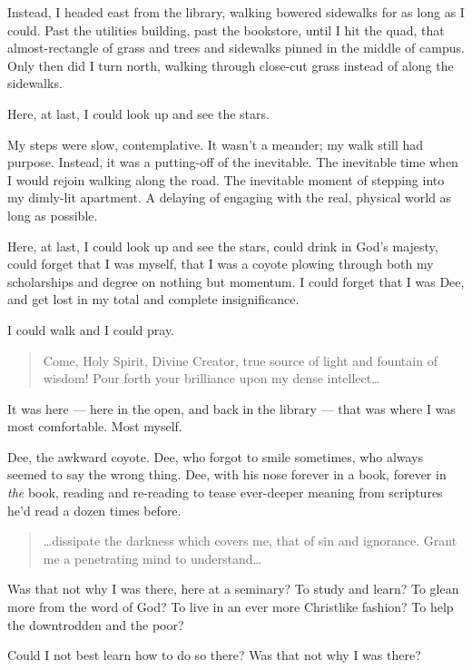 Instead, I headed east from the library, walking bowered sidewalks for as long as I could. Past the utilities building, past the bookstore, until I hit the quad, that almost-rectangle of grass and trees and sidewalks pinned in the middle of campus. Only then did I turn north, walking through close-cut grass instead of along the sidewalks.

Here, at last, I could look up and see the stars.

My steps were slow, contemplative. It wasn't a meander; my walk still had purpose. Instead, it was a putting-off of the inevitable. The inevitable time when I would rejoin walking along the road. The inevitable moment of stepping into my dimly-lit apartment. A delaying of engaging with the real, physical world as long as possible.

Here, at last, I could look up and see the stars, could drink in God's majesty, could forget that I was myself, that I was a coyote plowing through both my scholarships and degree on nothing but momentum. I could forget that I was Dee, and get lost in my total and complete insignificance.

I could walk and I could pray.

\begin{quote}
Come, Holy Spirit, Divine Creator, true source of light and fountain of wisdom! Pour forth your brilliance upon my dense intellect\ldots{}
\end{quote}

It was here --- here in the open, and back in the library --- that was where I was most comfortable. Most myself.

Dee, the awkward coyote. Dee, who forgot to smile sometimes, who always seemed to say the wrong thing. Dee, with his nose forever in a book, forever in \emph{the} book, reading and re-reading to tease ever-deeper meaning from scriptures he'd read a dozen times before.

\begin{quote}
\ldots dissipate the darkness which covers me, that of sin and ignorance. Grant me a penetrating mind to understand\ldots{}
\end{quote}

Was that not why I was there, here at a seminary? To study and learn? To glean more from the word of God? To live in an ever more Christlike fashion? To help the downtrodden and the poor?

Could I not best learn how to do so there? Was that not why I was there?

